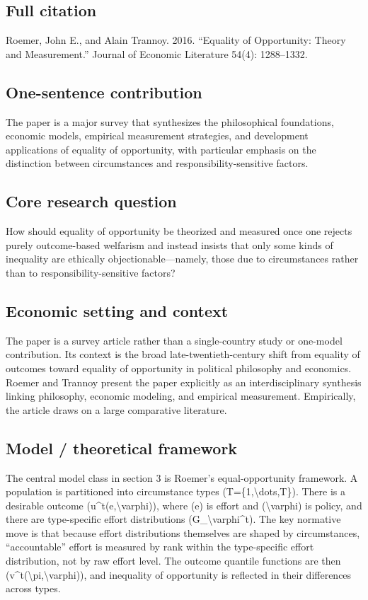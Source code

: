 \documentclass[11pt,a4paper]{article}
\begin{document}
\subsection*{Full citation}
Roemer, John E., and Alain Trannoy. 2016. “Equality of Opportunity: Theory and Measurement.” Journal of Economic Literature 54(4): 1288–1332.

\subsection*{One-sentence contribution}
The paper is a major survey that synthesizes the philosophical foundations, economic models, empirical measurement strategies, and development applications of equality of opportunity, with particular emphasis on the distinction between circumstances and responsibility-sensitive factors.

\subsection*{Core research question}
How should equality of opportunity be theorized and measured once one rejects purely outcome-based welfarism and instead insists that only some kinds of inequality are ethically objectionable—namely, those due to circumstances rather than to responsibility-sensitive factors?

\subsection*{Economic setting and context}
The paper is a survey article rather than a single-country study or one-model contribution. Its context is the broad late-twentieth-century shift from equality of outcomes toward equality of opportunity in political philosophy and economics. Roemer and Trannoy present the paper explicitly as an interdisciplinary synthesis linking philosophy, economic modeling, and empirical measurement. Empirically, the article draws on a large comparative literature.

\subsection*{Model / theoretical framework}
The central model class in section 3 is Roemer’s equal-opportunity framework. A population is partitioned into circumstance types (T=\{1,\textbackslash{}dots,T\}). There is a desirable outcome (u\textasciicircum{}t(e,\textbackslash{}varphi)), where (e) is effort and (\textbackslash{}varphi) is policy, and there are type-specific effort distributions (G\_\textbackslash{}varphi\textasciicircum{}t). The key normative move is that because effort distributions themselves are shaped by circumstances, “accountable” effort is measured by rank within the type-specific effort distribution, not by raw effort level. The outcome quantile functions are then (v\textasciicircum{}t(\textbackslash{}pi,\textbackslash{}varphi)), and inequality of opportunity is reflected in their differences across types.
\end{document}
